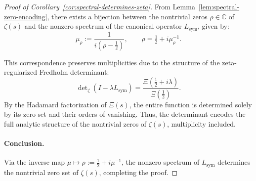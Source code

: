 \begin{proof}[Proof of Corollary~\ref{cor:spectral-determines-zeta}]
From Lemma~\ref{lem:spectral-zero-encoding}, there exists a bijection between the nontrivial zeros \( \rho \in \mathbb{C} \) of \( \zeta(s) \) and the nonzero spectrum of the canonical operator \( L_{\mathrm{sym}} \), given by:
\[
\mu_\rho := \frac{1}{i(\rho - \tfrac{1}{2})}, \qquad
\rho = \tfrac{1}{2} + i\mu_\rho^{-1}.
\]

This correspondence preserves multiplicities due to the structure of the zeta-regularized Fredholm determinant:
\[
\det\nolimits_\zeta(I - \lambda L_{\mathrm{sym}}) = \frac{\Xi(\tfrac{1}{2} + i\lambda)}{\Xi(\tfrac{1}{2})}.
\]
By the Hadamard factorization of \( \Xi(s) \), the entire function is determined solely by its zero set and their orders of vanishing. Thus, the determinant encodes the full analytic structure of the nontrivial zeros of \( \zeta(s) \), multiplicity included.

\paragraph{Conclusion.}
Via the inverse map \( \mu \mapsto \rho := \tfrac{1}{2} + i\mu^{-1} \), the nonzero spectrum of \( L_{\mathrm{sym}} \) determines the nontrivial zero set of \( \zeta(s) \), completing the proof.
\end{proof}
